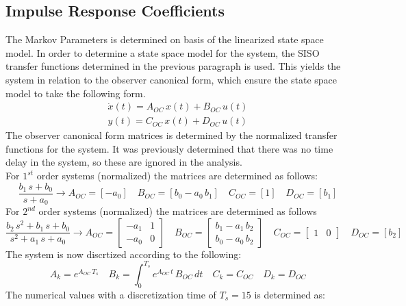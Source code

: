 \subsection{Impulse Response Coefficients}
\label{sec:Imp_res}
The Markov Parameters is determined on basis of the linearized state space model. In order to determine a state space model for the system, the SISO transfer functions determined in the previous paragraph is used. This yields the system in relation to the observer canonical form, which ensure the state space model to take the following form.
\begin{equation}
    \begin{gathered}
        \dot{x}(t)=A_{OC}\,x(t)+B_{OC}\,u(t) \\
        y(t) = C_{OC}\,x(t)+D_{OC}\,u(t)
    \end{gathered}
\end{equation}
The observer canonical form matrices is determined by the normalized transfer functions for the system. It was previously determined that there was no time delay in the system, so these are ignored in the analysis.\\
For $1^{st}$ order systems (normalized) the matrices are determined as follows:
\begin{equation}
    \frac{b_1\,s+b_0}{s+a_0}\xrightarrow{}
    A_{OC}=[-a_0] \quad 
    B_{OC}=[b_0-a_0\,b_1] \quad 
    C_{OC}=[1] \quad 
    D_{OC}=[b_1]
\end{equation}
For $2^{nd}$ order systems (normalized) the matrices are determined as follows
\begin{equation}
    \frac{b_2\,s^2+b_1\,s+b_0}{s^2+a_1\,s+a_0}\xrightarrow{}
    A_{OC}=\begin{bmatrix} -a_1 & 1 \\ -a_0 & 0 \end{bmatrix} \quad 
    B_{OC}=\begin{bmatrix} b_1-a_1\,b_2 \\ b_0-a_0\,b_2 \end{bmatrix} \quad 
    C_{OC}=\begin{bmatrix} 1 & 0 \end{bmatrix} \quad 
    D_{OC}=[b_2]
\end{equation}
The system is now discrtized according to the following:
\begin{equation}
    A_k=e^{A_{OC}\,T_s} \quad B_k=\int_0^{T_s}e^{A_{OC}\,t}\,B_{OC}\,dt \quad
    C_k=C_{OC} \quad
    D_k=D_{OC}
\end{equation}
The numerical values with a discretization time of $T_s=15$ is determined as:
